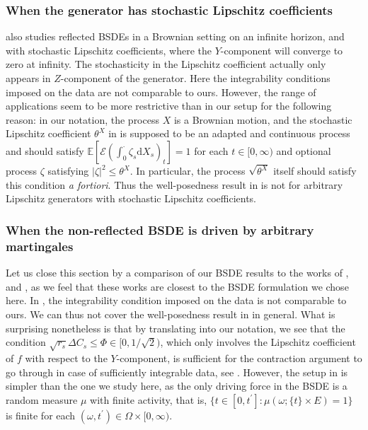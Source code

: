 \documentclass[10pt]{article} %
\newcommand\cE{\mathcal E}
\def \E{\mathbb{E}}
\newcommand{\1}{\mathbf{1}}
\def\d{\mathrm{d}}
\begin{document}
\subsubsection{When the generator has stochastic Lipschitz coefficients}

\citeauthor*{perninge2021note} \cite{perninge2021note} also studies reflected BSDEs in a Brownian setting on an infinite horizon, and with stochastic Lipschitz coefficients, where the $Y$-component will converge to zero at infinity. The stochasticity in the Lipschitz coefficient actually only appears in $Z$-component of the generator. Here the integrability conditions imposed on the data are not comparable to ours. However, the range of applications seem to be more restrictive than in our setup for the following reason: in our notation, the process $X$ is a Brownian motion, and the stochastic Lipschitz coefficient $\theta^X$ in \cite{perninge2021note} is supposed to be an adapted and continuous process and should satisfy $\E[\cE(\int_0^\cdot \zeta_s\d X_s)_t] = 1$ for each $t \in [0,\infty)$ and optional process $\zeta$ satisfying $|\zeta|^2 \leq \theta^X$. In particular, the process $\sqrt{\theta^X}$ itself should satisfy this condition \emph{a fortiori}. Thus the well-posedness result in \cite{perninge2021note} is not for arbitrary Lipschitz generators with stochastic Lipschitz coefficients.


\subsubsection{When the non-reflected BSDE is driven by arbitrary martingales}

Let us close this section by a comparison of our BSDE results to the works of \citeauthor*{bandini2015existence} \cite{bandini2015existence}, \citeauthor*{cohen2012existence} \cite{cohen2012existence} and \citeauthor*{papapantoleon2018existence} \cite{papapantoleon2018existence}, as we feel that these works are closest to the BSDE formulation we chose here. In \cite{bandini2015existence}, the integrability condition imposed on the data is not comparable to ours. We can thus not cover the well-posedness result in \cite{bandini2015existence} in general. What is surprising nonetheless is that by translating \cite{bandini2015existence} into our notation, we see that the condition $\sqrt{r_s}\Delta C_s \leq \Phi \in [0,1/\sqrt{2})$, which only involves the Lipschitz coefficient of $f$ with respect to the $Y$-component, is sufficient for the contraction argument to go through in case of sufficiently integrable data, see \cite[Theorem 4.1]{bandini2015existence}. However, the setup in \cite{bandini2015existence} is simpler than the one we study here, as the only driving force in the BSDE is a random measure $\mu$ with finite activity, that is, $\{t \in [0,t^\prime] : \mu(\omega; \{t\} \times E) = 1\}$ is finite for each $(\omega,t^\prime) \in \Omega \times [0,\infty)$. 
\end{document}
